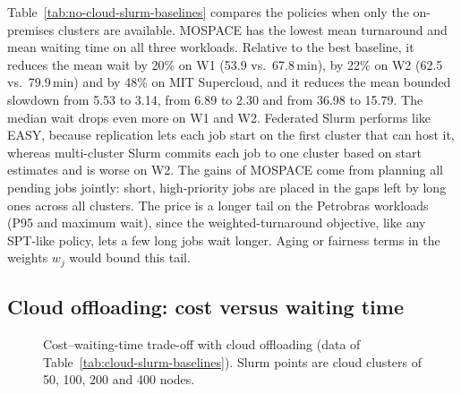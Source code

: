\documentclass[conference]{IEEEtran}
\begin{document}
Table~\ref{tab:no-cloud-slurm-baselines} compares the policies when only the on-premises clusters are available. MOSPACE has the lowest mean turnaround and mean waiting time on all three workloads. Relative to the best baseline, it reduces the mean wait by 20\% on W1 (53.9 vs.\ 67.8\,min), by 22\% on W2 (62.5 vs.\ 79.9\,min) and by 48\% on MIT Supercloud, and it reduces the mean bounded slowdown from 5.53 to 3.14, from 6.89 to 2.30 and from 36.98 to 15.79. The median wait drops even more on W1 and W2. Federated Slurm performs like EASY, because replication lets each job start on the first cluster that can host it, whereas multi-cluster Slurm commits each job to one cluster based on start estimates and is worse on W2. The gains of MOSPACE come from planning all pending jobs jointly: short, high-priority jobs are placed in the gaps left by long ones across all clusters. The price is a longer tail on the Petrobras workloads (P95 and maximum wait), since the weighted-turnaround objective, like any SPT-like policy, lets a few long jobs wait longer. Aging or fairness terms in the weights $w_j$ would bound this tail.

\subsection{Cloud offloading: cost versus waiting time}

\begin{figure}[t]
\centering
{}
\caption{Cost--waiting-time trade-off with cloud offloading (data of Table~\ref{tab:cloud-slurm-baselines}). Slurm points are cloud clusters of 50, 100, 200 and 400 nodes.}
\label{fig:tradeoff}
\end{figure}
\end{document}
